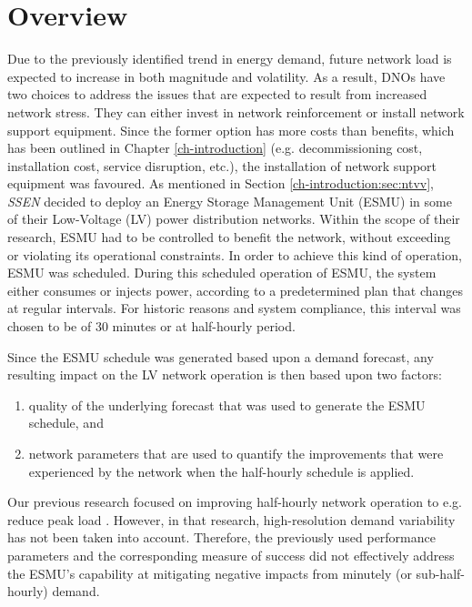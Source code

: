 \section{Overview}
\label{ch1:sec:overview}

Due to the previously identified trend in energy demand, future network load is expected to increase in both magnitude and volatility.
As a result, DNOs have two choices to address the issues that are expected to result from increased network stress.
They can either invest in network reinforcement or install network support equipment.
Since the former option has more costs than benefits, which has been outlined in Chapter \ref{ch-introduction} (e.g. decommissioning cost, installation cost, service disruption, etc.), the installation of network support equipment was favoured.
As mentioned in Section \ref{ch-introduction:sec:ntvv}, \textit{SSEN} decided to deploy an Energy Storage Management Unit (ESMU) in some of their Low-Voltage (LV) power distribution networks.
Within the scope of their research, ESMU had to be controlled to benefit the network, without exceeding or violating its operational constraints.
In order to achieve this kind of operation, ESMU was scheduled.
During this scheduled operation of ESMU, the system either consumes or injects power, according to a predetermined plan that changes at regular intervals.
For historic reasons and system compliance, this interval was chosen to be of 30 minutes or at half-hourly period.

Since the ESMU schedule was generated based upon a demand forecast, any resulting impact on the LV network operation is then based upon two factors:

\begin{enumerate}
	\item quality of the underlying forecast that was used to generate the ESMU schedule, and
	\item network parameters that are used to quantify the improvements that were experienced by the network when the half-hourly schedule is applied.
\end{enumerate}

Our previous research focused on improving half-hourly network operation to e.g. reduce peak load \cite{Rowe2014a, Yunusov2011}.
However, in that research, high-resolution demand variability has not been taken into account.
Therefore, the previously used performance parameters and the corresponding measure of success did not effectively address the ESMU's capability at mitigating negative impacts from minutely (or sub-half-hourly) demand.

